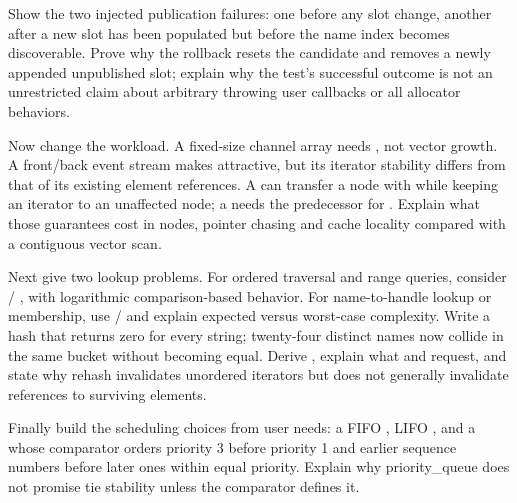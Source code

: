 Show the two injected publication failures: one before any slot change, another after a new slot has been populated but before the name index becomes discoverable. Prove why the rollback resets the candidate and removes a newly appended unpublished slot; explain why the test's successful outcome is not an unrestricted claim about arbitrary throwing user callbacks or all allocator behaviors.

Now change the workload. A fixed-size channel array needs , not vector growth. A front/back event stream makes  attractive, but its iterator stability differs from that of its existing element references. A  can transfer a node with  while keeping an iterator to an unaffected node; a  needs the predecessor for . Explain what those guarantees cost in nodes, pointer chasing and cache locality compared with a contiguous vector scan.

Next give two lookup problems. For ordered traversal and range queries, consider  / , with logarithmic comparison-based behavior. For name-to-handle lookup or membership, use  /  and explain expected versus worst-case complexity. Write a hash that returns zero for every string; twenty-four distinct names now collide in the same bucket without becoming equal. Derive , explain what  and  request, and state why rehash invalidates unordered iterators but does not generally invalidate references to surviving elements.

Finally build the scheduling choices from user needs: a FIFO , LIFO , and a  whose comparator orders priority 3 before priority 1 and earlier sequence numbers before later ones within equal priority. Explain why priority\_queue does not promise tie stability unless the comparator defines it.

